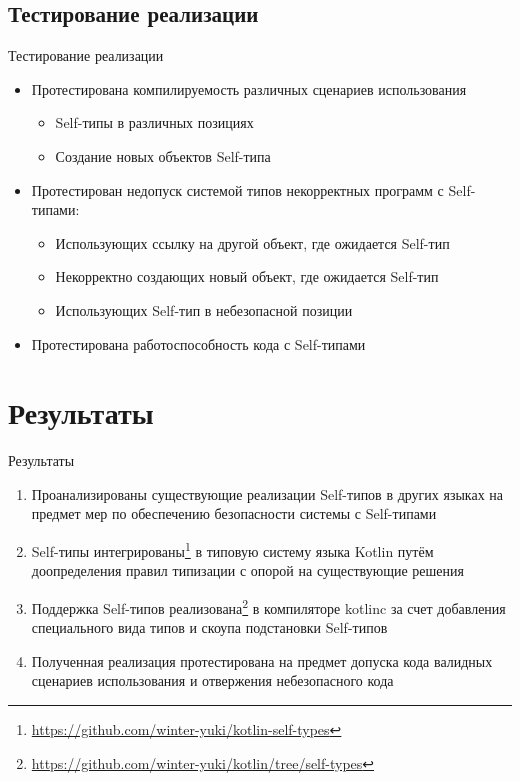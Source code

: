 \documentclass[aspectratio=169,usenames,dvipsnames]{beamer}
\begin{document}
    \subsection{Тестирование реализации}

    \begin{frame}{Тестирование реализации}

        \begin{itemize}
            \item Протестирована компилируемость различных сценариев использования
            \begin{itemize}
                \item Self-типы в различных позициях
                \item Создание новых объектов Self-типа
            \end{itemize}
            \item Протестирован недопуск системой типов некорректных программ с Self-типами:
            \begin{itemize}
                \item Использующих ссылку на другой объект, где ожидается Self-тип
                \item Некорректно создающих новый объект, где ожидается Self-тип
                \item Использующих Self-тип в небезопасной позиции
            \end{itemize}
            \item Протестирована работоспособность кода с Self-типами
        \end{itemize}
    \end{frame}


    \section{Результаты}

    \begin{frame}{Результаты}

        \begin{enumerate}
            \item Проанализированы существующие реализации Self-типов в других языках на предмет мер по обеспечению безопасности системы с Self-типами
            \item Self-типы интегрированы\footnote{\url{https://github.com/winter-yuki/kotlin-self-types}} в типовую систему языка Kotlin путём доопределения правил типизации с опорой на существующие решения
            \item Поддержка Self-типов реализована\footnote{\url{https://github.com/winter-yuki/kotlin/tree/self-types}} в компиляторе kotlinc за счет добавления специального вида типов и скоупа подстановки Self-типов
            \item Полученная реализация протестирована на предмет допуска кода валидных сценариев использования и отвержения небезопасного кода
        \end{enumerate}
    \end{frame}
\end{document}

